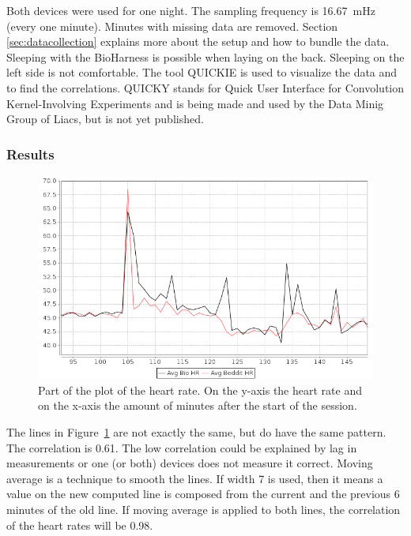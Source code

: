 			Both devices were used for one night. The sampling frequency is \SI{16.67}{\milli\hertz} (every one minute). Minutes with missing data are removed. Section \ref{sec:datacollection} explains more about the setup and how to bundle the data. Sleeping with the BioHarness is possible when laying on the back. Sleeping on the left side is not comfortable. The tool QUICKIE is used to visualize the data and to find the correlations. QUICKY stands for Quick User Interface for Convolution Kernel-Involving Experiments and is being made and used by the Data Minig Group of Liacs, but is not yet published.

		\subsubsection{Results}
			
			\begin{figure}[h]
				\centering
					\includegraphics[scale=0.5]{avgbiovsavgbeddit.png}
					
				\caption{Part of the plot of the heart rate. On the y-axis the heart rate and on the x-axis the amount of minutes after the start of the session.}
				\label{fig:avgbiovsavgbeddit}

			\end{figure}

			The lines in Figure~\ref{fig:avgbiovsavgbeddit} are not exactly the same, but do have the same pattern. The correlation is 0.61. The low correlation could be explained by lag in measurements or one (or both) devices does not measure it correct. Moving average is a technique to smooth the lines. If width 7 is used, then it means a value on the new computed line is composed from the current and the previous 6 minutes of the old line. If moving average is applied to both lines, the correlation of the heart rates will be 0.98.\
						
